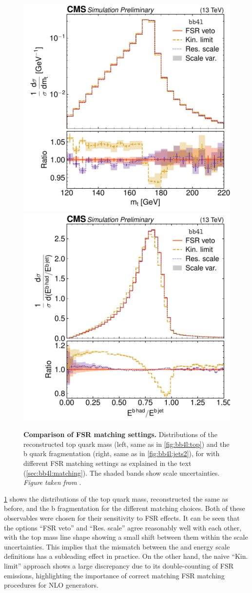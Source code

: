 \begin{figure}[tp]
    \centering
    \includegraphics[width=0.49 \textwidth]{figures/bb4l/matching/ADDED_top_mass.pdf}
    \hfill
    \includegraphics[width=0.49 \textwidth]{figures/bb4l/matching/MC_HFJETS_efracB.pdf}
    \caption{\textbf{Comparison of FSR matching settings.} Distributions of the reconstructed top quark mass (left, same as in \cref{fig:bb4l:top}) and the b quark fragmentation (right, same as in \cref{fig:bb4l:jets2}), for \bbfourl with different FSR matching settings as explained in the text (\cref{sec:bb4l:matching}). The shaded bands show scale uncertainties. \textit{Figure taken from }.}
    \label{fig:bb4l:matching}
\end{figure}

\cref{fig:bb4l:matching} shows the distributions of the top quark mass, reconstructed the same as before, and the b fragmentation for the different matching choices. Both of these observables were chosen for their sensitivity to FSR effects. It can be seen that the options ``FSR veto'' and ``Res. scale'' agree reasonably well with each other, with the top mass line shape showing a small shift between them within the scale uncertainties. This implies that the mismatch between the \powheg and \pythia energy scale definitions has a subleading effect in practice. On the other hand, the naive ``Kin. limit'' approach shows a large discrepancy due to its double-counting of FSR emissions, highlighting the importance of correct matching FSR matching procedures for NLO generators.

